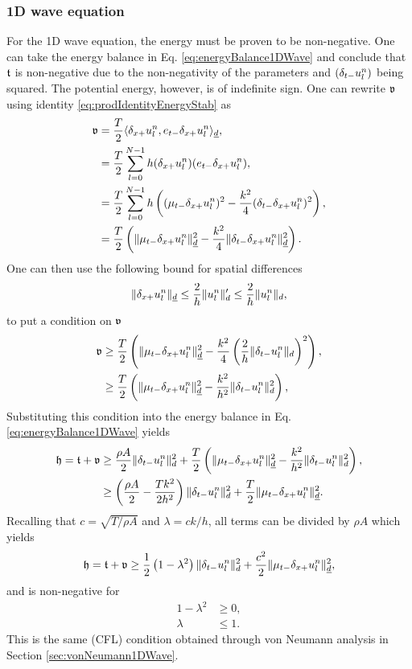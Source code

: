 {{\subsubsection{1D wave equation}
For the 1D wave equation, the energy must be proven to be non-negative. One can take the energy balance in Eq. \eqref{eq:energyBalance1DWave} and conclude that $\mathfrak{t}$ is non-negative due to the non-negativity of the parameters and $(\delta_{t-} u_l^n)$ being squared. The potential energy, however, is of indefinite sign. One can rewrite $\mathfrak{v}$ using identity \eqref{eq:prodIdentityEnergyStab} as
\begin{align*}
    \mathfrak{v} &= \frac{T}{2} \langle \delta_{x+} u_l^n, e_{t-}\delta_{x+} u_l^n\rangle_{\underline{d}},\\
    &= \frac{T}{2} \sum_{l=0}^{N-1} h(\delta_{x+} u_l^n)(e_{t-}\delta_{x+}u_l^n),\\
    &= \frac{T}{2} \sum_{l=0}^{N-1} h\left((\mu_{t-} \delta_{x+} u_l^n)^2 - \frac{k^2}{4}(\delta_{t-}\delta_{x+} u_l^n)^2\right),\\
    &= \frac{T}{2}\left(\lVert\mu_{t-}\delta_{x+}u_l^n\rVert_{\underline{d}}^2-\frac{k^2}{4}\lVert\delta_{t-}\delta_{x+} u_l^n\rVert_{\underline{d}}^2\right).
\end{align*}
One can then use the following bound for spatial differences \cite{theBible}
\begin{equation}\label{eq:spatialBound}
    \lVert \delta_{x+} u_l^n \rVert_{\underline{d}} \leq \frac{2}{h}\lVert u_l^n \rVert_d' \leq \frac{2}{h}\lVert u_l^n \rVert_d,
\end{equation}
to put a condition on $\mathfrak{v}$
\begin{align*}
    \mathfrak{v} &\geq \frac{T}{2}\left(\lVert\mu_{t-}\delta_{x+}u_l^n\rVert_{\underline{d}}^2 - \frac{k^2}{4}\left(\frac{2}{h}\lVert\delta_{t-}u_l^n\rVert_{d}\right)^2\right),\\
    &\geq \frac{T}{2}\left(\lVert\mu_{t-}\delta_{x+}u_l^n\rVert_{\underline{d}}^2 - \frac{k^2}{h^2}\lVert\delta_{t-}u_l^n\rVert_{d}^2\right),
\end{align*}
Substituting this condition into the energy balance in Eq. \eqref{eq:energyBalance1DWave} yields
\begin{align*}
    \mathfrak{h} = \mathfrak{t} + \mathfrak{v} &\geq \frac{\rho A}{2}\lVert\delta_{t-} u_l^n\rVert^2_d + \frac{T}{2}\left(\lVert\mu_{t-}\delta_{x+}u_l^n\rVert_{\underline{d}}^2 - \frac{k^2}{h^2}\lVert\delta_{t-}u_l^n\rVert_{d}^2\right),\\
    &\geq \left(\frac{\rho A}{2} - \frac{Tk^2}{2h^2}\right)\lVert \delta_{t-} u_l^n\rVert_d^2 + \frac{T}{2}
    \lVert\mu_{t-}\delta_{x+} u_l^n\rVert_{\underline{d}}^2.
\end{align*}
Recalling that $c = \sqrt{T /\rho A}$ and $\lambda = ck/h$, all terms can be divided by $\rho A$ which yields
\begin{equation}
    \mathfrak{h} = \mathfrak{t} + \mathfrak{v} \geq \frac{1}{2}\left(1 - \lambda^2\right)\lVert \delta_{t-} u_l^n\rVert_d^2 + \frac{c^2}{2}
    \lVert\mu_{t-}\delta_{x+} u_l^n\rVert_{\underline{d}}^2,
\end{equation}
and is non-negative for
\begin{align*}
    1-\lambda^2 &\geq 0,\\
    \lambda &\leq 1.
\end{align*}
This is the same (CFL) condition obtained through von Neumann analysis in Section \ref{sec:vonNeumann1DWave}.

}}
